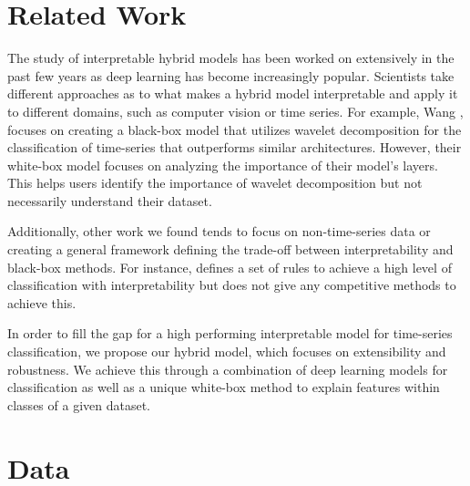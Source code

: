 \documentclass{turabian-thesis}
\begin{document}
\chapter{Related Work}
\label{chap:relatedwork}

The study of interpretable hybrid models has been worked on extensively in the past few years as deep learning has become increasingly popular. Scientists take different approaches as to what makes a hybrid model interpretable and apply it to different domains, such as computer vision or time series. For example, Wang \cite{wang_multilevel_2018}, focuses on creating a black-box model that utilizes wavelet decomposition for the classification of time-series that outperforms similar architectures. However, their white-box model focuses on analyzing the importance of their model's layers. This helps users identify the importance of wavelet decomposition but not necessarily understand their dataset. 

Additionally, other work we found tends to focus on non-time-series data or creating a general framework defining the trade-off between interpretability and black-box methods. For instance, \cite{wang_hybrid_2019} defines a set of rules to achieve a high level of classification with interpretability but does not give any competitive methods to achieve this. 

In order to fill the gap for a high performing interpretable model for time-series classification, we propose our hybrid model, which focuses on extensibility and robustness. We achieve this through a combination of deep learning models for classification as well as a unique white-box method to explain features within classes of a given dataset.




\chapter{Data}
\end{document}
